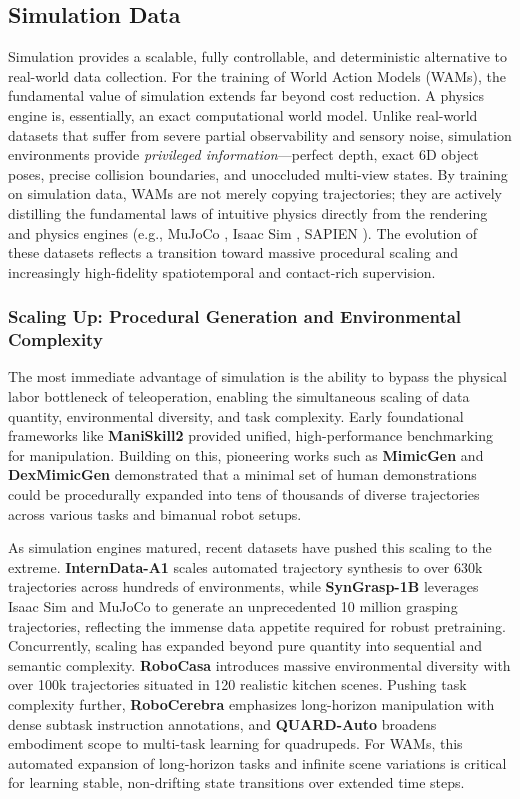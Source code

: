 \subsection{Simulation Data}
\label{sec:data_sim}
Simulation provides a scalable, fully controllable, and deterministic alternative to real-world data collection. For the training of World Action Models (WAMs), the fundamental value of simulation extends far beyond cost reduction. A physics engine is, essentially, an exact computational world model. Unlike real-world datasets that suffer from severe partial observability and sensory noise, simulation environments provide \textit{privileged information}—perfect depth, exact 6D object poses, precise collision boundaries, and unoccluded multi-view states. By training on simulation data, WAMs are not merely copying trajectories; they are actively distilling the fundamental laws of intuitive physics directly from the rendering and physics engines (e.g., MuJoCo \cite{Mujoco}, Isaac Sim \cite{IssacSim}, SAPIEN \cite{SAPIEN}). The evolution of these datasets reflects a transition toward massive procedural scaling and increasingly high-fidelity spatiotemporal and contact-rich supervision.

\subsubsection{Scaling Up: Procedural Generation and Environmental Complexity} 
The most immediate advantage of simulation is the ability to bypass the physical labor bottleneck of teleoperation, enabling the simultaneous scaling of data quantity, environmental diversity, and task complexity. Early foundational frameworks like \textbf{ManiSkill2} \cite{ManiSkill2} provided unified, high-performance benchmarking for manipulation. Building on this, pioneering works such as \textbf{MimicGen} \cite{MimicGen} and \textbf{DexMimicGen} \cite{DexMimicGen} demonstrated that a minimal set of human demonstrations could be procedurally expanded into tens of thousands of diverse trajectories across various tasks and bimanual robot setups. 

As simulation engines matured, recent datasets have pushed this scaling to the extreme. \textbf{InternData-A1} \cite{InternData-A1} scales automated trajectory synthesis to over 630k trajectories across hundreds of environments, while \textbf{SynGrasp-1B} \cite{SynGrasp-1B} leverages Isaac Sim and MuJoCo to generate an unprecedented 10 million grasping trajectories, reflecting the immense data appetite required for robust pretraining. Concurrently, scaling has expanded beyond pure quantity into sequential and semantic complexity. \textbf{RoboCasa} \cite{RoboCasa} introduces massive environmental diversity with over 100k trajectories situated in 120 realistic kitchen scenes. Pushing task complexity further, \textbf{RoboCerebra} \cite{RoboCerebra} emphasizes long-horizon manipulation with dense subtask instruction annotations, and \textbf{QUARD-Auto} \cite{QUARD-Auto} broadens embodiment scope to multi-task learning for quadrupeds. For WAMs, this automated expansion of long-horizon tasks and infinite scene variations is critical for learning stable, non-drifting state transitions over extended time steps.

